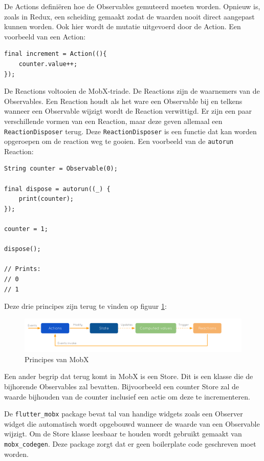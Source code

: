 De Actions definiëren hoe de Observables gemuteerd moeten worden. Opnieuw is, zoals in Redux, een scheiding gemaakt zodat de waarden nooit direct aangepast kunnen worden. Ook hier wordt de mutatie uitgevoerd door de Action.
Een voorbeeld van een Action:
\begin{verbatim}
final increment = Action((){
    counter.value++;
});    
\end{verbatim}

De Reactions voltooien de MobX-triade. De Reactions zijn de waarnemers van de Observables. Een Reaction houdt als het ware een Observable bij en telkens wanneer een Observable wijzigt wordt de Reaction verwittigd. Er zijn een paar verschillende vormen van een Reaction, maar deze geven allemaal een \verb|ReactionDisposer| terug. Deze \verb|ReactionDisposer| is een functie dat kan worden opgeroepen om de reaction weg te gooien. Een voorbeeld van de \verb|autorun| Reaction:
\begin{verbatim}
String counter = Observable(0);

final dispose = autorun((_) {
    print(counter);
});

counter = 1;

dispose();

// Prints:
// 0
// 1
\end{verbatim}

Deze drie principes zijn terug te vinden op figuur \ref{fig:mobx-principles}:

\begin{figure}[H]
    \centering
    \includegraphics[width=\linewidth]{img/stand-van-zaken/mobx-principles.png}
    \caption{Principes van MobX \autocite{MobX2019}}
    \label{fig:mobx-principles}
\end{figure}

Een ander begrip dat terug komt in MobX is een Store. Dit is een klasse die de bijhorende Observables zal bevatten. Bijvoorbeeld een counter Store zal de waarde bijhouden van de counter inclusief een actie om deze te incrementeren.

De  \verb|flutter_mobx| package bevat tal van handige widgets zoals een Observer widget die automatisch wordt opgebouwd wanneer de waarde van een Observable wijzigt. 
Om de Store klasse leesbaar te houden wordt gebruikt gemaakt van \verb|mobx_codegen|. Deze package zorgt dat er geen boilerplate code geschreven moet worden. 
